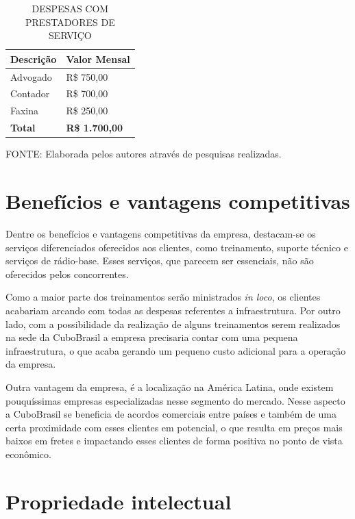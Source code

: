 \documentclass[
	12pt,				%
	openright,			%
	oneside,			%
	a4paper,			%
	english,			%
	french,				%
	spanish,			%
	brazil				%
	]{abntex2}
\begin{document}
	\begin{table} [th]
	\caption{DESPESAS COM PRESTADORES DE SERVIÇO}
	\centering
	\begin{tabular}{p{6cm}|p{6cm}}

		\textbf{Descrição} & \textbf{Valor Mensal}\\
		\hline
		Advogado & R\$ 750,00 \\
		Contador & R\$ 700,00 \\
		Faxina & R\$ 250,00 \\
		\hline
		\textbf{Total} & \textbf{R\$ 1.700,00}	
	
	\end{tabular}
	
	\begin{small}
		FONTE: Elaborada pelos autores através de pesquisas realizadas.
	\end{small}	
	\end{table}\pagebreak
	
\section[Benefícios e vantagens competitivas]{Benefícios e vantagens competitivas}

	Dentre os benefícios e vantagens competitivas da empresa, destacam-se os serviços diferenciados oferecidos aos clientes, como treinamento, suporte técnico e serviços de rádio-base. Esses serviços, que parecem ser essenciais, não são oferecidos pelos concorrentes.
	
	Como a maior parte dos treinamentos serão ministrados \textit{in loco}, os clientes acabariam arcando com todas as despesas referentes a infraestrutura. Por outro lado, com a possibilidade da realização de alguns treinamentos serem realizados na sede da CuboBrasil a empresa precisaria contar com uma pequena infraestrutura, o que acaba gerando um pequeno custo adicional para a operação da empresa.
	
	Outra vantagem da empresa, é a localização na América Latina, onde existem pouquíssimas empresas especializadas nesse segmento do mercado. Nesse aspecto a CuboBrasil se beneficia de acordos comerciais entre países e também de uma certa proximidade com esses clientes em potencial, o que resulta em preços mais baixos em fretes e impactando esses clientes de forma positiva no ponto de vista econômico.

\section[Propriedade intelectual]{Propriedade intelectual}
\end{document}
